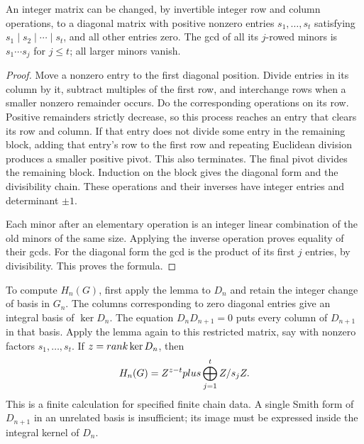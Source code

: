 \begin{lemma}\label{ntg:lem:smith}
An integer matrix can be changed, by invertible integer row and column
operations, to a diagonal matrix with positive nonzero entries
$s_1,\ldots,s_t$ satisfying $s_1\mid s_2\mid\cdots\mid s_t$,
and all other entries zero. The gcd of all its $j$-rowed minors is
$s_1\cdots s_j$ for $j\le t$; all larger minors vanish.
\end{lemma}
\begin{proof}
Move a nonzero entry to the first diagonal position. Divide entries
in its column by it, subtract multiples of the first row, and interchange
rows when a smaller nonzero remainder occurs. Do the corresponding
operations on its row. Positive remainders strictly decrease, so this
process reaches an entry that clears its row and column. If that
entry does not divide some entry in the remaining block, adding that
entry's row to the first row and repeating Euclidean division produces
a smaller positive pivot. This also terminates. The final pivot
divides the remaining block. Induction on the block gives the diagonal
form and the divisibility chain. These operations and their inverses
have integer entries and determinant $\pm1$.

Each minor after an elementary operation is an integer linear
combination of the old minors of the same size. Applying the inverse
operation proves equality of their gcds. For the diagonal form the gcd
is the product of its first $j$ entries, by divisibility. This proves
the formula.
\end{proof}

To compute $H_n(G)$, first apply the lemma to $D_n$ and retain the
integer change of basis in $G_n$. The columns corresponding to zero
diagonal entries give an integral basis of $\ker D_n$. The equation
$D_nD_{n+1}=0$ puts every column of $D_{n+1}$ in that basis. Apply
the lemma again to this restricted matrix, say with nonzero factors
$s_1,\ldots,s_t$. If $z=rank\ker D_n$, then
\begin{equation}\label{ntg:eq:homology-algorithm}
 H_n(G)=Z^{z-t}plus\bigoplus_{j=1}^tZ/s_jZ.
\end{equation}
This is a finite calculation for specified finite chain data. A single
Smith form of $D_{n+1}$ in an unrelated basis is insufficient; its
image must be expressed inside the integral kernel of $D_n$.

